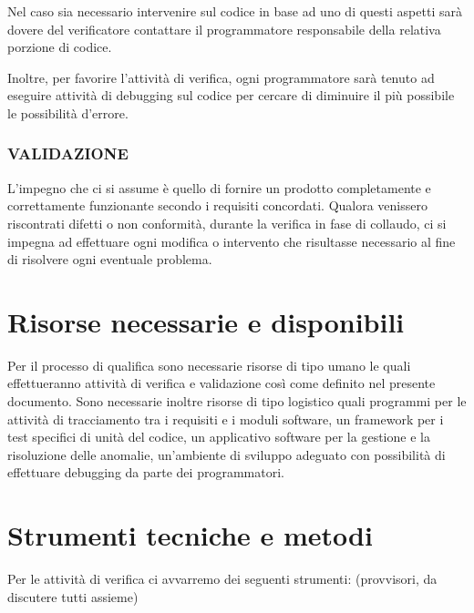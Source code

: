 Nel caso sia necessario intervenire sul codice in base ad uno di questi aspetti
sar\`a dovere del verificatore contattare il programmatore responsabile della
relativa porzione di codice.

Inoltre, per favorire l'attivit\`a di verifica, ogni programmatore sar\`a tenuto
ad eseguire attivit\`a di debugging sul codice per cercare di diminuire il pi\`u
possibile le possibilit\`a d'errore.

\subsubsection*{VALIDAZIONE}

L'impegno che ci si assume \`e quello di fornire un prodotto completamente e
correttamente funzionante secondo i requisiti concordati. Qualora venissero
riscontrati difetti o non conformit\`a, durante la verifica in fase di collaudo,
ci si impegna ad effettuare ogni modifica o intervento che risultasse necessario
al fine di risolvere ogni eventuale problema.

\section{Risorse necessarie e disponibili}

Per il processo di qualifica sono necessarie risorse di tipo umano le quali
effettueranno attivit\`a di verifica e validazione cos\`i come definito nel
presente documento. Sono necessarie inoltre risorse di tipo logistico quali
programmi per le attivit\`a di tracciamento tra i requisiti e i moduli software,
un framework per i test specifici di unit\`a del codice, un applicativo software
per la gestione e la risoluzione delle anomalie, un'ambiente di sviluppo
adeguato con possibilit\`a di effettuare debugging da parte dei programmatori.
	
\section{Strumenti tecniche e metodi}

Per le attivit\`a di verifica ci avvarremo dei seguenti strumenti:
(provvisori, da discutere tutti assieme)

